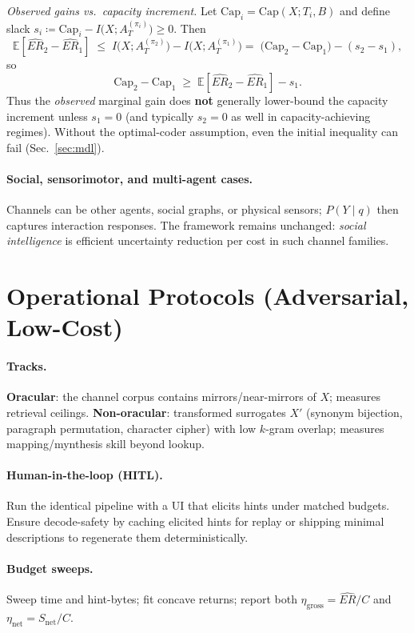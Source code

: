 \documentclass[12pt,a4paper]{article}
\begin{document}
\textit{Observed gains vs.\ capacity increment.}
Let $\mathrm{Cap}_i=\mathrm{Cap}(X;T_i,B)$ and define slack $s_i\coloneqq \mathrm{Cap}_i - I\big(X;A_T^{(\pi_i)}\big)\ge 0$. Then
\[
\mathbb{E}[\widehat{ER}_2-\widehat{ER}_1] \;\le\; I\big(X;A_T^{(\pi_2)}\big)-I\big(X;A_T^{(\pi_1)}\big)
=\;\big(\mathrm{Cap}_2-\mathrm{Cap}_1\big) - (s_2 - s_1),
\]
so
\[
\mathrm{Cap}_2-\mathrm{Cap}_1 \;\ge\; \mathbb{E}[\widehat{ER}_2-\widehat{ER}_1] - s_1.
\]
Thus the \emph{observed} marginal gain does \textbf{not} generally lower-bound the capacity increment unless $s_1=0$ (and typically $s_2=0$ as well in capacity-achieving regimes). Without the optimal-coder assumption, even the initial inequality can fail (Sec.~\ref{sec:mdl}).

\paragraph{Social, sensorimotor, and multi-agent cases.}
Channels can be other agents, social graphs, or physical sensors; $P(Y\mid q)$ then captures interaction responses. The framework remains unchanged: \emph{social intelligence} is efficient uncertainty reduction per cost in such channel families.

\section{Operational Protocols (Adversarial, Low-Cost)}
\label{sec:protocols}
\paragraph{Tracks.}
\textbf{Oracular}: the channel corpus contains mirrors/near-mirrors of $X$; measures retrieval ceilings. 
\textbf{Non-oracular}: transformed surrogates $X'$ (synonym bijection, paragraph permutation, character cipher) with low $k$-gram overlap; measures mapping/mynthesis skill beyond lookup.

\paragraph{Human-in-the-loop (HITL).}
Run the identical pipeline with a UI that elicits hints under matched budgets. Ensure decode-safety by caching elicited hints for replay or shipping minimal descriptions to regenerate them deterministically.

\paragraph{Budget sweeps.}
Sweep time and hint-bytes; fit concave returns; report both $\eta_{\text{gross}}=\widehat{ER}/C$ and $\eta_{\text{net}}=S_{\text{net}}/C$.
\end{document}
